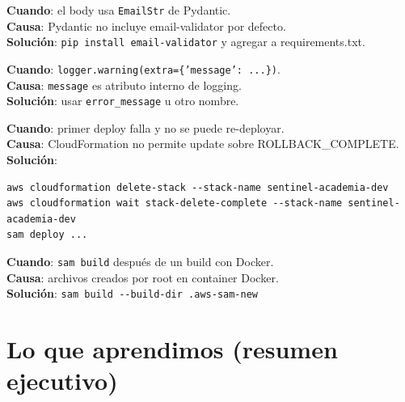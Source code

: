 \documentclass[11pt,a4paper,oneside]{article}
\begin{document}
\begin{tcolorbox}[colback=errred!5!white,colframe=errred,breakable,title={Error 5: email-validator not installed}]
\textbf{Cuando}: el body usa \texttt{EmailStr} de Pydantic. \\
\textbf{Causa}: Pydantic no incluye email-validator por defecto. \\
\textbf{Soluci\'on}: \texttt{pip install email-validator} y agregar a requirements.txt.
\end{tcolorbox}

\begin{tcolorbox}[colback=errred!5!white,colframe=errred,breakable,title={Error 6: KeyError 'message' in LogRecord}]
\textbf{Cuando}: \texttt{logger.warning(extra=\{'message': ...\})}. \\
\textbf{Causa}: \texttt{message} es atributo interno de logging. \\
\textbf{Soluci\'on}: usar \texttt{error\_message} u otro nombre.
\end{tcolorbox}

\begin{tcolorbox}[colback=errred!5!white,colframe=errred,breakable,title={Error 7: Stack en ROLLBACK\_COMPLETE}]
\textbf{Cuando}: primer deploy falla y no se puede re-deployar. \\
\textbf{Causa}: CloudFormation no permite update sobre ROLLBACK\_COMPLETE. \\
\textbf{Soluci\'on}:
\begin{lstlisting}
aws cloudformation delete-stack --stack-name sentinel-academia-dev
aws cloudformation wait stack-delete-complete --stack-name sentinel-academia-dev
sam deploy ...
\end{lstlisting}
\end{tcolorbox}

\begin{tcolorbox}[colback=errred!5!white,colframe=errred,breakable,title={Error 8: \_\_pycache\_\_ permission denied en rebuild}]
\textbf{Cuando}: \texttt{sam build} despu\'es de un build con Docker. \\
\textbf{Causa}: archivos creados por root en container Docker. \\
\textbf{Soluci\'on}: \texttt{sam build -{}-build-dir .aws-sam-new}
\end{tcolorbox}

\section{Lo que aprendimos (resumen ejecutivo)}
\end{document}
